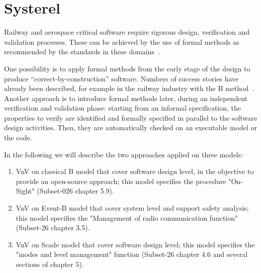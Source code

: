 \documentclass{template/openetcs_report}
\newcommand{\mychapter}[2]{
    \setcounter{chapter}{#1}
    \setcounter{section}{0}
    \chapter*{#2}
}
\begin{document}










\let\paragraph\oldparagraph
\let\paragraph\oldsubparagraph


\mychapter{5}{Systerel}
\label{sec:systerel}

Railway and aerospace critical software require rigorous design, verification and validation processes. These can be achieved by the use of formal  methods as recommended by  the standards in these domains~\cite{standard_railway_2011,standard_aerospace_2011}.

One possibility is to apply formal methods from the early stage of the design to produce ``correct-by-construction'' software. Numbers of success stories have already been described, for example in the railway industry with the B method~\cite{behm1999meteor,DBLP:conf/zum/BadeauA05,essame2006b}. Another approach is to introduce formal  methods later, during an independent verification and validation phase: starting from an informal specification, the properties to verify are identified and formally  specified in parallel to the software design activities. Then, they are automatically checked on an executable model or the code.

In the following we will describe the two approaches applied on three models:

\begin{enumerate}
\item VnV on classical B  model that cover software design level, in the objective to provide an open-source approach; this model specifies the procedure "On-Sight" (Subset-026 chapter 5.9).
\item VnV on Event-B model that cover system level and support safety analysis; this model specifies the "Management of radio communication function" (Subset-26 chapter 3.5).
\item VnV on Scade model that cover software design level; this model specifies the "modes and level management" function (Subset-26 chapter 4.6 and several sections of chapter 5).
\end{enumerate}
\end{document}
